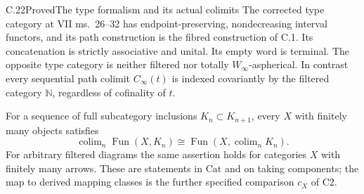 \begin{claim}{C.22}{Proved}{The type formalism and its actual colimits}
The corrected type category at VII ms.~26--32 has
endpoint-preserving, nondecreasing interval functors, and its path
construction is the fibred construction of C.1. Its concatenation
is strictly associative and unital. Its empty word is terminal.
The opposite type category is neither filtered nor totally
$W_\infty$-aspherical. In contrast every sequential path colimit
$C_\infty(t)$ is indexed covariantly by the filtered category
$\mathbb N$, regardless of cofinality of $t$.

For a sequence of full subcategory inclusions $K_n\subset K_{n+1}$,
every $X$ with finitely many objects satisfies
\[
 \operatorname{colim}_n\operatorname{Fun}(X,K_n)
       \cong\operatorname{Fun}(X,\operatorname{colim}_nK_n).
                                                               \tag{C.22.1}
\]
For arbitrary filtered diagrams the same assertion holds for
categories $X$ with finitely many arrows. These are statements
in $\mathrm{Cat}$ and on taking components; the map to derived
mapping classes is the further specified comparison $c_X$ of C2.
\end{claim}
